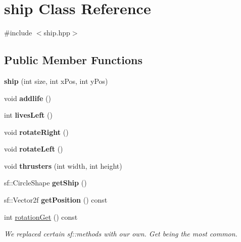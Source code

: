 \hypertarget{classship}{}\section{ship Class Reference}
\label{classship}


{\ttfamily \#include $<$ship.\+hpp$>$}

\subsection*{Public Member Functions}
\begin{DoxyCompactItemize}
\item 
\mbox{\label{classship_ae4c561265a100a727a8d1cb3c38f56d8}} 
{\bfseries ship} (int size, int x\+Pos, int y\+Pos)
\item 
\mbox{\label{classship_af731a8fd841445b2da58bd1ccafc9f6d}} 
void {\bfseries addlife} ()
\item 
\mbox{\label{classship_a8d48d4b6187c48b31f6255458686051e}} 
int {\bfseries lives\+Left} ()
\item 
\mbox{\label{classship_a7140791a9c86c42405bc2c65ef9dcf37}} 
void {\bfseries rotate\+Right} ()
\item 
\mbox{\label{classship_a86296d1b9ab64ab3821ca1e538de04f2}} 
void {\bfseries rotate\+Left} ()
\item 
\mbox{\label{classship_a285f7af23dd7b66301b865baab27fad9}} 
void {\bfseries thrusters} (int width, int height)
\item 
\mbox{\label{classship_ae154788c5fa40e80ca0166cddce2ae31}} 
sf\+::\+Circle\+Shape {\bfseries get\+Ship} ()
\item 
\mbox{\label{classship_a3ac26b45fd83a5546a25ea364458b93d}} 
sf\+::\+Vector2f {\bfseries get\+Position} () const
\item 
\mbox{\label{classship_abb6032f9738208a343dcc3532153ddba}} 
int \hyperlink{classship_abb6032f9738208a343dcc3532153ddba}{rotation\+Get} () const
\begin{DoxyCompactList}\small\item\em We replaced certain sf\+::methods with our own. Get being the most common. \end{DoxyCompactList}\item 

\end{DoxyCompactItemize}
